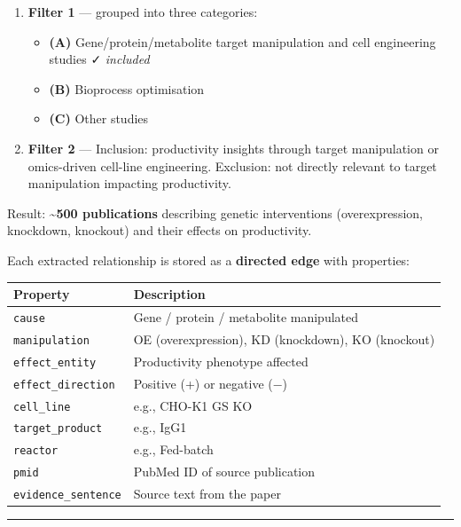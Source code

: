 \documentclass[
  letterpaper,
  oneside,
  open=any]{scrbook}
\newcounter{none} %
\providecommand{\tightlist}{%
  \setlength{\itemsep}{0pt}\setlength{\parskip}{0pt}}
\begin{document}
\begin{enumerate}
\def\labelenumi{\arabic{enumi}.}
\tightlist
\item
  \textbf{Filter 1} --- grouped into three categories:

  \begin{itemize}
  \tightlist
  \item
    \textbf{(A)} Gene/protein/metabolite target manipulation and cell
    engineering studies ✓ \emph{included}
  \item
    \textbf{(B)} Bioprocess optimisation
  \item
    \textbf{(C)} Other studies
  \end{itemize}
\item
  \textbf{Filter 2} --- Inclusion: productivity insights through target
  manipulation or omics-driven cell-line engineering. Exclusion: not
  directly relevant to target manipulation impacting productivity.
\end{enumerate}

Result: \textbf{\textasciitilde500 publications} describing genetic
interventions (overexpression, knockdown, knockout) and their effects on
productivity.

Each extracted relationship is stored as a \textbf{directed edge} with
properties:

{\def\LTcaptype{none} %
\begin{longtable}[]{@{}ll@{}}
\toprule\noalign{}
Property & Description \\
\midrule\noalign{}
\endhead
\bottomrule\noalign{}
\endlastfoot
\texttt{cause} & Gene / protein / metabolite manipulated \\
\texttt{manipulation} & OE (overexpression), KD (knockdown), KO
(knockout) \\
\texttt{effect\_entity} & Productivity phenotype affected \\
\texttt{effect\_direction} & Positive (+) or negative (−) \\
\texttt{cell\_line} & e.g., CHO-K1 GS KO \\
\texttt{target\_product} & e.g., IgG1 \\
\texttt{reactor} & e.g., Fed-batch \\
\texttt{pmid} & PubMed ID of source publication \\
\texttt{evidence\_sentence} & Source text from the paper \\
\end{longtable}
}

\begin{center}\rule{0.5\linewidth}{0.5pt}\end{center}
\end{document}
